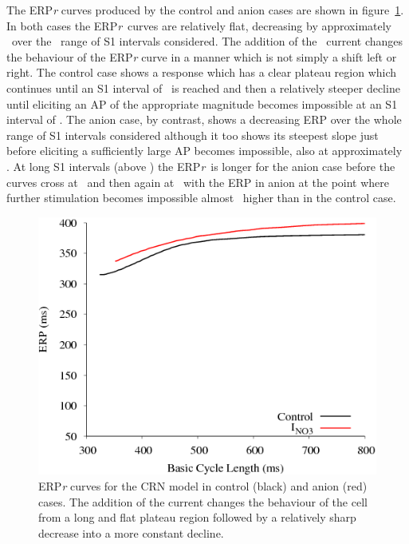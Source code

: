 The ERP\emph{r} curves produced by the control and anion cases are shown in
figure~\ref{anion:erpr}.  In both cases the ERP\emph{r}\ curves are relatively
flat, decreasing by approximately \ over the \ range of S1
intervals considered.  The addition of the \ current changes the
behaviour of the ERP\emph{r} curve in a manner which is not simply a shift left
or right.  The control case shows a response which has a clear plateau region
which continues until an S1 interval of \ is reached and then a
relatively steeper decline until eliciting an AP of the appropriate magnitude
becomes impossible at an S1 interval of .  The anion case, by contrast,
shows a decreasing ERP over the whole range of S1 intervals considered although
it too shows its steepest slope just before eliciting a sufficiently large AP
becomes impossible, also at approximately .  At long S1 intervals (above
) the ERP\emph{r}\ is longer for the anion case before the curves cross
at \  and then again at \ with the ERP in anion at the point
where further stimulation becomes impossible almost \ higher than in the
control case.

\begin{figure}
\includegraphics{figures/toolkit/anion/04_ERPR}
\caption[Anion Sensitive Effective Refractory Period Restitution]{
\label{anion:erpr} ERP\emph{r} curves for the CRN model in control (black) and anion
(red) cases.  The
addition of the  current changes the behaviour of the cell from a long
and flat plateau region followed by a relatively sharp decrease into a more
constant decline.}
\end{figure}

